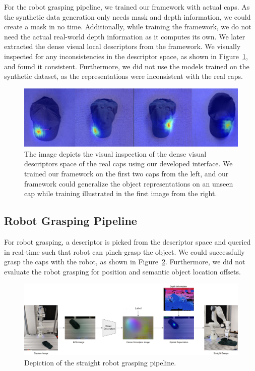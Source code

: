 For the robot grasping pipeline, we trained our framework with actual caps.
As the synthetic data generation only needs mask and depth information, we could create a mask in no time.
Additionally, while training the framework, we do not need the actual real-world depth information as it computes its own.
We later extracted the dense visual local descriptors from the framework.
We visually inspected for any inconsistencies in the descriptor space, as shown in Figure~\ref{fig:check_real_caps},
and found it consistent. Furthermore, we did not use the models trained on the synthetic dataset, as the representations were inconsistent with the real caps.

\begin{figure}[htb]
    \centering
    \includegraphics[scale=0.125]{../images/test_real_caps.png}
    \caption{The image depicts the visual inspection of the dense visual descriptors space of the real caps using our developed interface. We trained our framework on the first two caps from the left, and our framework could generalize the object representations on an unseen cap while training illustrated in the first image from the right.}
    \label{fig:check_real_caps}
\end{figure}



\subsection{Robot Grasping Pipeline}

For robot grasping, a descriptor is picked from the descriptor space and queried in real-time such that robot can pinch-grasp the object.
We could successfully grasp the caps with the robot, as shown in Figure~\ref{fig:straight_grasp}.
Furthermore, we did not evaluate the robot grasping for position and semantic object location offsets.

\begin{figure}[htb]
    \centering
    \includegraphics[scale=0.1]{../images/straight_grasps.png}
    \caption{Depiction of the straight robot grasping pipeline.}
    \label{fig:straight_grasp}
\end{figure}

